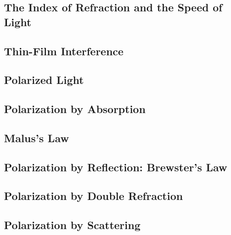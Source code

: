 \documentclass[twocolumn]{article}
\begin{document}
\subsection{The Index of Refraction and the Speed of Light}
\begin{outline}
\1 
\end{outline}
\subsection{Thin-Film Interference}
\begin{outline}
\1 
\end{outline}
\subsection{Polarized Light}
\begin{outline}
\1 
\end{outline}
\subsection{Polarization by Absorption}
\begin{outline}
\1 
\end{outline}
\subsection{Malus's Law}
\begin{outline}
\1 
\end{outline}
\subsection{Polarization by Reflection: Brewster's Law}
\begin{outline}
\1 
\end{outline}
\subsection{Polarization by Double Refraction}
\begin{outline}
\1 
\end{outline}
\subsection{Polarization by Scattering}
\begin{outline}
\1 
\end{outline}
\end{document}
